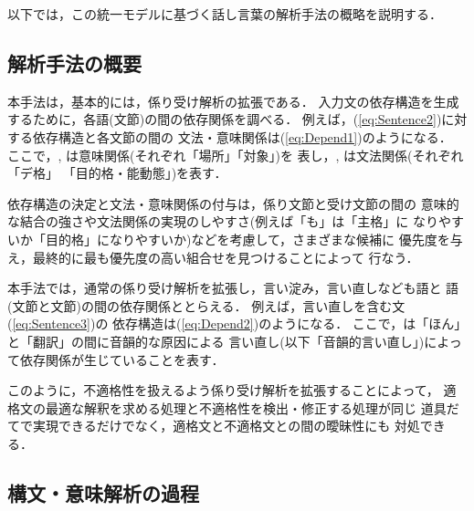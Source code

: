 以下では，この統一モデルに基づく話し言葉の解析手法の概略を説明する．

\subsection{解析手法の概要}\label{sec:Uniform:Overview}

本手法は，基本的には，係り受け解析の拡張である．
入力文の依存構造を生成するために，各語(文節)の間の依存関係を調べる．
例えば，(\ref{eq:Sentence2})に対する依存構造と各文節の間の
文法・意味関係は(\ref{eq:Depend1})のようになる．
ここで，, は意味関係(それぞれ「場所」「対象」)を
表し，, は文法関係(それぞれ「デ格」
「目的格・能動態」)を表す．

依存構造の決定と文法・意味関係の付与は，係り文節と受け文節の間の
意味的な結合の強さや文法関係の実現のしやすさ(例えば「も」は「主格」に
なりやすいか「目的格」になりやすいか)などを考慮して，さまざまな候補に
優先度を与え，最終的に最も優先度の高い組合せを見つけることによって
行なう．

本手法では，通常の係り受け解析を拡張し，言い淀み，言い直しなども語と
語(文節と文節)の間の依存関係ととらえる．
例えば，言い直しを含む文(\ref{eq:Sentence3})の
依存構造は(\ref{eq:Depend2})のようになる．
ここで，は「ほん」と「翻訳」の間に音韻的な原因による
言い直し(以下「音韻的言い直し」)によって依存関係が生じていることを表す．

このように，不適格性を扱えるよう係り受け解析を拡張することによって，
適格文の最適な解釈を求める処理と不適格性を検出・修正する処理が同じ
道具だてで実現できるだけでなく，適格文と不適格文との間の曖昧性にも
対処できる．

\subsection{構文・意味解析の過程}\label{sec:Uniform:Process}

